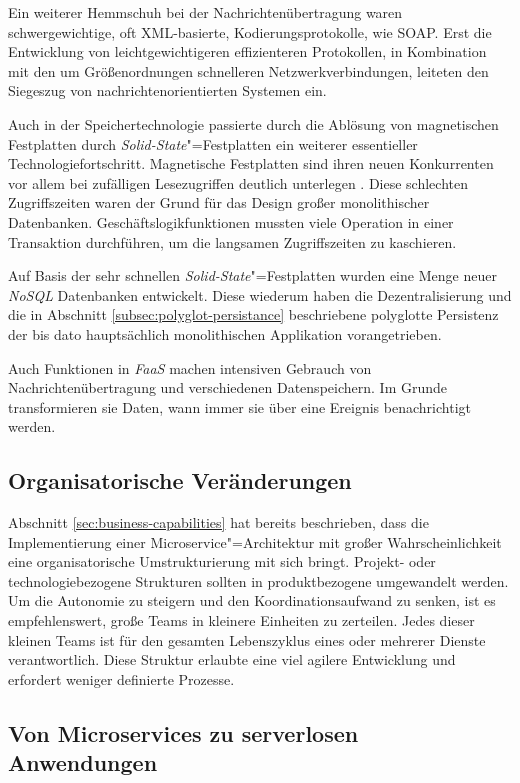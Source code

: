 Ein weiterer Hemmschuh bei der Nachrichtenübertragung waren schwergewichtige, oft XML-basierte, Kodierungsprotokolle, wie \zB SOAP. Erst die Entwicklung von leichtgewichtigeren \bzw effizienteren Protokollen, in Kombination mit den um Größenordnungen schnelleren Netzwerkverbindungen, leiteten den Siegeszug von nachrichtenorientierten Systemen ein.

Auch in der Speichertechnologie passierte durch die Ablösung von magnetischen Festplatten durch \textit{Solid-State}"=Festplatten ein weiterer essentieller Technologiefortschritt. Magnetische Festplatten sind ihren neuen Konkurrenten vor allem bei zufälligen Lesezugriffen deutlich unterlegen \cite{Regola:2012:CMV:2379436.2379437}. Diese schlechten Zugriffszeiten waren der Grund für das Design großer monolithischer Datenbanken. Geschäftslogikfunktionen mussten viele Operation in einer Transaktion durchführen, um die langsamen Zugriffszeiten zu kaschieren.

Auf Basis der sehr schnellen \textit{Solid-State}"=Festplatten wurden eine Menge neuer \textit{NoSQL} Datenbanken entwickelt. Diese wiederum haben die Dezentralisierung und die in Abschnitt \ref{subsec:polyglot-persistance} beschriebene polyglotte Persistenz der bis dato hauptsächlich monolithischen Applikation vorangetrieben.

Auch Funktionen in \textit{FaaS} machen intensiven Gebrauch von Nachrichtenübertragung und verschiedenen Datenspeichern. Im Grunde transformieren sie Daten, wann immer sie über eine Ereignis benachrichtigt werden.

\subsection{Organisatorische Veränderungen}

Abschnitt \ref{sec:business-capabilities} hat bereits beschrieben, dass die Implementierung einer Microservice"=Architektur mit großer Wahrscheinlichkeit eine organisatorische Umstrukturierung mit sich bringt. Projekt- oder technologiebezogene Strukturen sollten in produktbezogene umgewandelt werden. Um die Autonomie zu steigern und den Koordinationsaufwand zu senken, ist es empfehlenswert, große Teams in kleinere Einheiten zu zerteilen. Jedes dieser kleinen Teams ist für den gesamten Lebenszyklus eines oder mehrerer Dienste verantwortlich. Diese Struktur erlaubte eine viel agilere Entwicklung und erfordert weniger definierte Prozesse.

\subsection{Von Microservices zu serverlosen Anwendungen}


